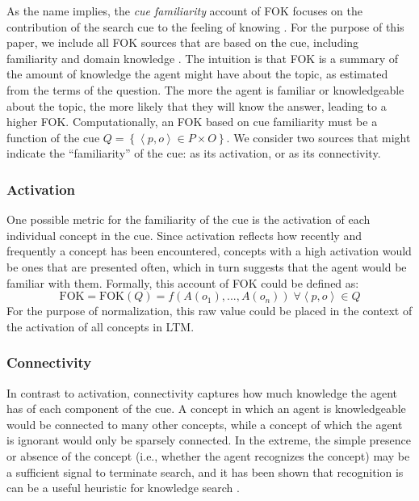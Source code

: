 \documentclass[10pt,letterpaper]{article}
\newcommand{\setof}[1]{\left \{ #1 \right \}}
\newcommand{\tuple}[1]{\left \langle #1 \right \rangle }
\newcommand{\fok}[0]{\text{FOK}}
\begin{document}
As the name implies, the \textit{cue familiarity} account of FOK focuses on the contribution of the search cue to the feeling of knowing \cite{Reder1992WhatDeterminesInitial,Metcalfe1993TheCueFamiliarity,Koriat2001TheCombinedContributions}.
For the purpose of this paper, we include all FOK sources that are based on the cue, including familiarity and domain knowledge \cite{Schwartz1994SourcesOfInformation}.
The intuition is that FOK is a summary of the amount of knowledge the agent might have about the topic, as estimated from the terms of the question.
The more the agent is familiar or knowledgeable about the topic, the more likely that they will know the answer, leading to a higher FOK.
Computationally, an FOK based on cue familiarity must be a function of the cue $Q = \setof{\tuple{p, o}{\in}P{\times}O}$.
We consider two sources that might indicate the ``familiarity'' of the cue: as its activation, or as its connectivity.

\subsubsection{Activation}

One possible metric for the familiarity of the cue is the activation of each individual concept in the cue.
Since activation reflects how recently and frequently a concept has been encountered, concepts with a high activation would be ones that are presented often, which in turn suggests that the agent would be familiar with them.
Formally, this account of FOK could be defined as:
$$\fok = \fok(Q) = f\left(A(o_1), ..., A(o_n)\right) \; \forall {\tuple{p, o}{\in}Q}$$
For the purpose of normalization, this raw value could be placed in the context of the activation of all concepts in LTM.

\subsubsection{Connectivity}

In contrast to activation, connectivity captures how much knowledge the agent has of each component of the cue.
A concept in which an agent is knowledgeable would be connected to many other concepts, while a concept of which the agent is ignorant would only be sparsely connected.
In the extreme, the simple presence or absence of the concept (i.e., whether the agent recognizes the concept) may be a sufficient signal to terminate search, and it has been shown that recognition is can be a useful heuristic for knowledge search \cite{Li2012FunctionalInteractionsBetween}.
\end{document}
